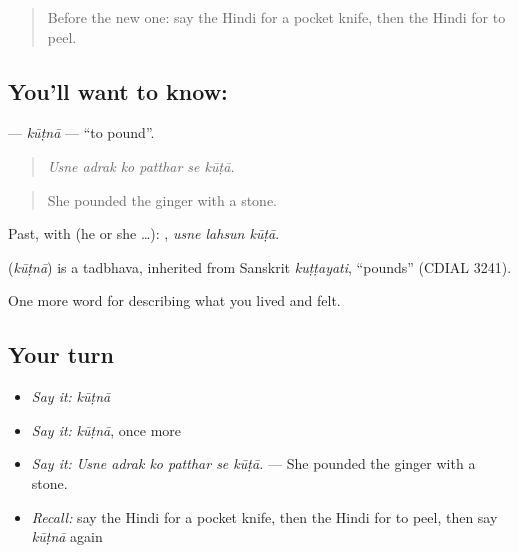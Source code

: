 \label{lesson:HI-C523-kutna}



\begin{quote}
Before the new one: say the Hindi for a pocket knife, then the Hindi for to peel.
\end{quote}

\subsection*{You'll want to know: }
\textbf{} — \emph{kūṭnā} — \textquotedblleft{}to pound\textquotedblright{}.

\begin{quote}
     
\end{quote}

\begin{quote}
\emph{Usne adrak ko patthar se kūṭā.}
\end{quote}

\begin{quote}
She pounded the ginger with a stone.
\end{quote}

Past, with  (he or she …):   , \emph{usne lahsun kūṭā}.

\begin{cousinweb}
\textbf{} (\emph{kūṭnā}) is a tadbhava, inherited from Sanskrit \emph{kuṭṭayati}, \textquotedblleft{}pounds\textquotedblright{} (CDIAL 3241).
\end{cousinweb}

\begin{grammarlens}[title={What you've built}]
One more word for describing what you lived and felt.
\end{grammarlens}

\subsection*{Your turn}
\begin{itemize}
\raggedright
  \item \emph{Say it:} \emph{kūṭnā}
  \item \emph{Say it:} \emph{kūṭnā}, once more
  \item \emph{Say it:} \emph{Usne adrak ko patthar se kūṭā.} — She pounded the ginger with a stone.
  \item \emph{Recall:} say the Hindi for a pocket knife, then the Hindi for to peel, then say \emph{kūṭnā} again
\end{itemize}


